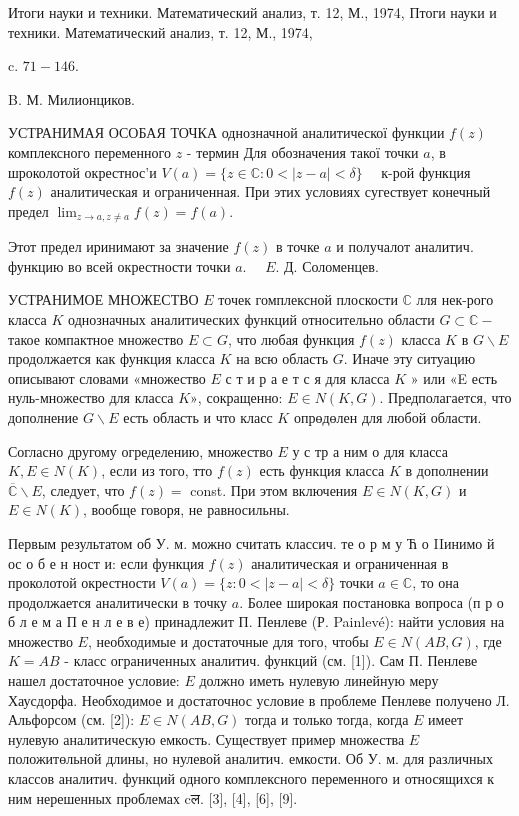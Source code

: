 \documentclass[10pt]{article}
\begin{document}
Итоги науки и техники. Математический анализ, т. 12, М., 1974, Птоги науки и техники. Математический анализ, т. 12, М., 1974,

c. $71-146$.

B. М. Милионциков.



УСТРАНИМАЯ ОСОБАЯ ТОЧКА однозначной аналитическої функции $f(z)$ комплексного переменного $z$ - термин Для обозначения такої точки $a$, в шроколотой окрестнос'и $V(a)=\{z \in \mathbb{C}: 0<|z-a|<\delta\} \quad$ к-рой функция $f(z)$ аналитическая и ограниченная. При этих условиях сугествует конечный предел $\lim _{z \rightarrow a, z \neq a} f(z)=f(a)$.



Этот предел иринимают за значение $f(z)$ в точке $a$ и получалот аналитич. функцию во всей окрестности точки $a$. $\quad E$. Д. Соломенцев.



УСТРАНИМОЕ МНОЖЕСТВО $E$ точек гомплексной плоскости $\mathbb{C}$ лля нек-рого класса $K$ однозначных аналитических функций относительно области $G \subset \mathbb{C}-$ такое компактное множество $E \subset G$, что любая функция $f(z)$ класса $K$ в $G \backslash E$ продолжается как функция класса $K$ на всю область $G$. Иначе эту ситуацию описывают словами «множество $E$ с т и р а е т с я для класса $K$ » или «E есть нуль-множество для класса $K »$, сокращенно: $E \in N(K, G)$. Предполагается, что дополнение $G \backslash E$ есть область и что класс $K$ опрөдөлен для любой области.



Согласно другому огределению, множество $E$ у с тр а ним о для класса $K, E \in N(K)$, если из того, тто $f(z)$ есть функция класса $K$ в дополнении $\overline{\mathbb{C}} \backslash E$, следует, что $f(z)=$ const. При этом включения $E \in N(K, G)$ и $E \in N(K)$, вообще говоря, не равносильны.



Первым результатом об У. м. можно считать классич. те о р м у Ћ о IIинимо й ос о б е н ност и: если функция $f(z)$ аналитическая и ограниченная в проколотой окрестности $V(a)=\{z: 0<|z-a|<\delta\}$ точки $a \in \mathbb{C}$, то она продолжается аналитически в точку $a$. Более широкая постановка вопроса (п р о б л е м а П е н л е в е) принадлежит П. Пенлеве (Р. Painlevé): найти условия на множество $E$, необходимые и достаточные для того, чтобы $E \in N(A B, G)$, где $K=A B$ - класс ограниченных аналитич. функций (см. [1]). Сам П. Пенлеве нашел достаточное условие: $E$ должно иметь нулевую линейную меру Хаусдорфа. Необходимое и достаточнос условие в проблеме Пенлеве получено Л. Альфорсом (см. [2]): $E \in N(A B, G)$ тогда и только тогда, когда $E$ имеет нулевую аналитическую емкость. Существует пример множества $E$ положитөльной длины, но нулевой аналитич. емкости. Об У. м. для различных классов аналитич. функций одного комплексного переменного и относящихся к ним нерешенных проблемах cल. [3], [4], [6], [9].
\end{document}
